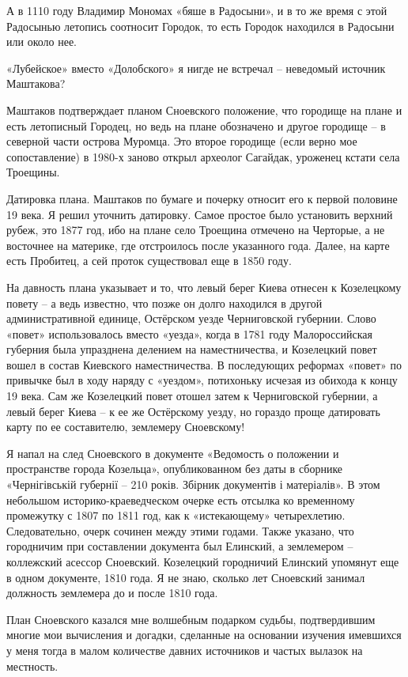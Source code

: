 А в 1110 году Владимир Мономах «бяше в Радосыни», и в то же время с этой Радосынью летопись соотносит Городок, то есть Городок находился в Радосыни или около нее.

«Лубейское» вместо «Долобского» я нигде не встречал – неведомый источник Маштакова? 

Маштаков подтверждает планом Сноевского положение, что городище на плане и есть летописный Городец, но ведь на плане обозначено и другое городище – в северной части острова Муромца. Это второе городище (если верно мое сопоставление) в 1980-х заново открыл археолог Сагайдак, уроженец кстати села Троещины.

Датировка плана. Маштаков по бумаге и почерку относит его к первой половине 19 века. Я решил уточнить датировку. Самое простое было установить верхний рубеж, это 1877 год, ибо на плане село Троещина отмечено на Черторые, а не восточнее на материке, где отстроилось после указанного года. Далее, на карте есть Пробитец, а сей проток существовал еще в 1850 году. 

На давность плана указывает и то, что левый берег Киева отнесен к Козелецкому повету – а ведь известно, что позже он долго находился в другой административной единице, Остёрском уезде Черниговской губернии. Слово «повет» использовалось вместо «уезда», когда в 1781 году Малороссийская губерния была упразднена делением на наместничества, и Козелецкий повет вошел в состав Киевского наместничества. В последующих реформах «повет» по привычке был в ходу наряду с «уездом», потихоньку исчезая из обихода к концу 19 века. Сам же Козелецкий повет отошел затем к Черниговской губернии, а левый берег Киева – к ее же Остёрскому уезду, но гораздо проще датировать карту по ее составителю, землемеру Сноевскому!

Я напал на след Сноевского в документе «Ведомость о положении и пространстве города Козельца», опубликованном без даты в сборнике «Чернігівській губернії – 210 років. Збірник документів і матеріалів»\cite{cherndoc01}. В этом небольшом историко-краеведческом очерке есть отсылка ко временному промежутку с 1807 по 1811 год, как к «истекающему» четырехлетию. Следовательно, очерк сочинен между этими годами. Также указано, что городничим при составлении документа был Елинский, а землемером – коллежский асессор Сноевский. Козелецкий городничий Елинский упомянут еще в одном документе, 1810 года. Я не знаю, сколько лет Сноевский занимал должность землемера до и после 1810 года.

План Сноевского казался мне волшебным подарком судьбы, подтвердившим многие мои вычисления и догадки, сделанные на основании изучения имевшихся у меня тогда в малом количестве давних источников и частых вылазок на местность.

